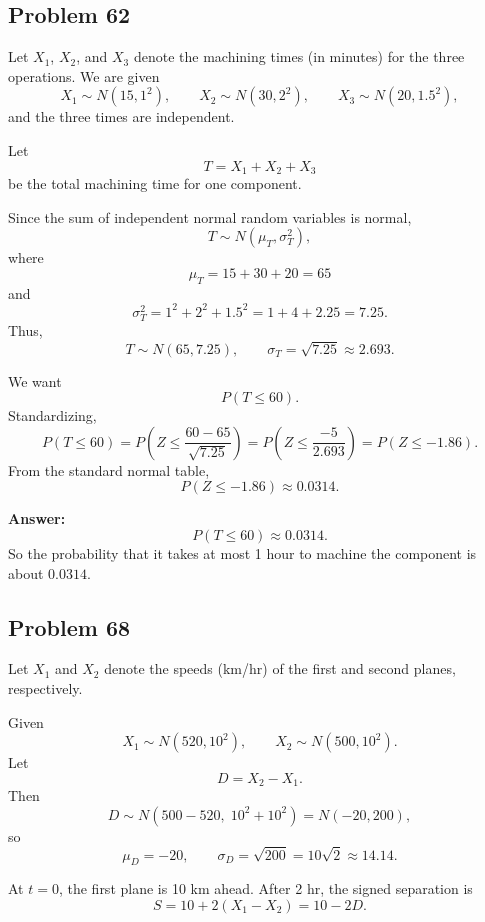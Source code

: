 \documentclass[11pt]{article}
\begin{document}
\subsection*{Problem 62}

Let $X_1$, $X_2$, and $X_3$ denote the machining times (in minutes) for the three operations. We are given
\[
X_1\sim N(15,1^2), \qquad X_2\sim N(30,2^2), \qquad X_3\sim N(20,1.5^2),
\]
and the three times are independent.

Let
\[
T=X_1+X_2+X_3
\]
be the total machining time for one component.

Since the sum of independent normal random variables is normal,
\[
T\sim N(\mu_T,\sigma_T^2),
\]
where
\[
\mu_T=15+30+20=65
\]
and
\[
\sigma_T^2=1^2+2^2+1.5^2=1+4+2.25=7.25.
\]
Thus,
\[
T\sim N(65,7.25),
\qquad
\sigma_T=\sqrt{7.25}\approx 2.693.
\]

We want
\[
P(T\le 60).
\]
Standardizing,
\[
P(T\le 60)=P\left(Z\le \frac{60-65}{\sqrt{7.25}}\right)
= P\left(Z\le \frac{-5}{2.693}\right)
= P(Z\le -1.86).
\]
From the standard normal table,
\[
P(Z\le -1.86)\approx 0.0314.
\]

\textbf{Answer:}
\[
P(T\le 60)\approx 0.0314.
\]
So the probability that it takes at most 1 hour to machine the component is about $0.0314$.

\subsection*{Problem 68}

Let $X_1$ and $X_2$ denote the speeds (km/hr) of the first and second planes, respectively.

Given
\[
X_1 \sim N(520,10^2), \qquad X_2 \sim N(500,10^2).
\]
Let
\[
D=X_2-X_1.
\]
Then
\[
D \sim N\!\left(500-520,\;10^2+10^2\right)=N(-20,200),
\]
so
\[
\mu_D=-20,\qquad \sigma_D=\sqrt{200}=10\sqrt{2}\approx 14.14.
\]

At $t=0$, the first plane is 10 km ahead. After 2 hr, the signed separation is
\[
S=10+2(X_1-X_2)=10-2D.
\]
\end{document}
